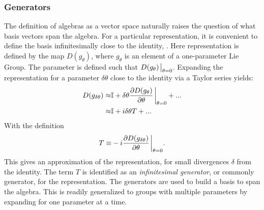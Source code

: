 \subsubsection{Generators}\label{sec:generators}
The definition of algebras as a vector space naturally raises the question of what basis vectors span the algebra.
For a particular representation, it is convenient to define the basis infinitesimally close to the identity, \ident.
Here representation is defined by the map $D(g_{\theta})$, where $g_{\theta}$ is an element of a one-parameter Lie Group.
The parameter is defined such that $D(g_{\theta})\eval_{\theta=0}$.
Expanding the representation for a parameter $\delta\theta$ close to the identity via a Taylor series yields:
\begin{equation}\begin{split}\label{eqn:taylorRep}
    D(g_{\delta\theta})\approx&\mathbb{I}+\delta\theta\frac{\partial D(g_{\theta})}{\partial\theta}\eval_{\theta=0} +...\\
    \approx&\mathbb{I}+i\delta\theta T+... \\
\end{split}\end{equation}
With the definition
\begin{equation}\begin{split}\label{eqn:generator}
    T\equiv&-i\frac{\partial D(g_{\delta\theta})}{\partial\theta}\eval_{\theta=0}. \\
\end{split}\end{equation} 
This gives an approximation of the representation, for small divergences $\delta$ from the identity.
The term $T$ is identified as an \emph{infinitesimal generator}, or commonly generator, for the representation.
The generators are used to build a basis to span the algebra.
This is readily generalized to groups with multiple parameters by expanding for one parameter at a time.


